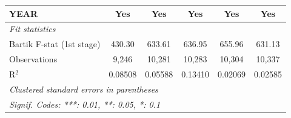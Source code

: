 \begin{table}[htbp]
{\begin{tabular}{lccccc}
      YEAR                                & Yes                              & Yes                             & Yes                                 & Yes                               & Yes\\  
      \midrule
      \emph{Fit statistics}\\
      Bartik F-stat (1st stage)   & 430.30                           & 633.61                          & 636.95                              & 655.96                            & 631.13\\  
      Observations                        & 9,246                            & 10,281                          & 10,283                              & 10,304                            & 10,337\\  
      R$^2$                               & 0.08508                          & 0.05588                         & 0.13410                             & 0.02069                           & 0.02585\\  
      \midrule \midrule
      \multicolumn{6}{l}{\emph{Clustered standard errors in parentheses}}\\
      \multicolumn{6}{l}{\emph{Signif. Codes: ***: 0.01, **: 0.05, *: 0.1}}\\
   \end{tabular}}
\end{table}


